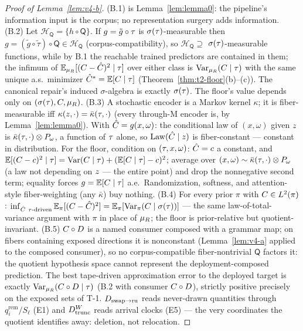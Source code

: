 \begin{proof}[Proof of Lemma~\ref{lem:v4-b}]
(B.1) is Lemma~\ref{lem:lemma0}: the pipeline's information input is the
corpus; no representation surgery adds information. (B.2) Let
$\mathcal{H}_{\mathsf{Q}} = \{h \circ \mathsf{Q}\}$. If
$g = \tilde{g} \circ \tape$ is
$\sigma(\tape)$-measurable then $g = (\tilde{g} \circ \tilde{\tau}) \circ
\mathsf{Q} \in \mathcal{H}_{\mathsf{Q}}$ (corpus-compatibility), so
$\mathcal{H}_{\mathsf{Q}} \supseteq$ $\sigma(\tape)$-measurable functions,
while by
B.1 the reachable trained predictors are contained in them; the infimum of
$\mathbb{E}_{\muR}[(\Ccons - \hat{\Ccons})^2 \mid \tape]$ over either class
is $\mathrm{Var}_{\muR}(\Ccons \mid \tape)$ with the same unique a.s.\
minimizer $\hat{\Ccons}^{*} = \mathbb{E}[\Ccons \mid \tape]$
(Theorem~\ref{thm:t2-floor}(b)--(c)). The canonical repair's induced
$\sigma$-algebra is exactly $\sigma(\tape)$. The floor's value depends only
on $(\sigma(\tape), \Ccons, \muR)$. (B.3) A stochastic encoder is a Markov
kernel $\kappa$; it is fiber-measurable iff
$\kappa(\rawflow, \cdot) = \bar{\kappa}(\tape, \cdot)$ (every through-M
encoder is, by Lemma~\ref{lem:lemma0}). With $\hat{\Ccons} = g(x, \omega)$:
the conditional law of $(x, \omega)$ given $\rawflow$ is
$\bar{\kappa}(\tape, \cdot) \otimes P_\omega$, a function of $\tape$ alone,
so $\mathrm{Law}(\hat{\Ccons} \mid \rawflow)$ is fiber-constant --- constant
in distribution. For the floor, condition on $(\tape, x, \omega)$:
$\hat{\Ccons} = c$ a constant, and
$\mathbb{E}[(\Ccons - c)^2 \mid \tape] = \mathrm{Var}(\Ccons \mid \tape) +
(\mathbb{E}[\Ccons \mid \tape] - c)^2$; average over
$(x,\omega) \sim \bar{\kappa}(\tape,\cdot) \otimes P_\omega$ (a law not
depending on $\rawflow$ --- the entire point) and drop the nonnegative
second term; equality forces $g = \mathbb{E}[\Ccons \mid \tape]$ a.e.\
Randomization, softness, and attention-style fiber-weighting (any
$\bar{\kappa}$) buy nothing. (B.4) For every prior $\pi$ with $\Ccons \in
L^2(\pi)$: $\inf_{\hat{\Ccons}\ \tape\text{-driven}}
\mathbb{E}_\pi[(\Ccons - \hat{\Ccons})^2] =
\mathbb{E}_\pi[\mathrm{Var}_\pi(\Ccons \mid \sigma(\tape))]$ --- the same
law-of-total-variance argument with $\pi$ in place of $\muR$; the floor is
prior-relative but quotient-invariant. (B.5) $\Ccons \circ D$ is a named
consumer composed with a grammar map; on fibers containing exposed
directions it is nonconstant (Lemma~\ref{lem:v4-a} applied to the composed
consumer), so no corpus-compatible fiber-nontrivial $\mathsf{Q}$ factors it: the
quotient hypothesis space cannot represent the deployment-composed
prediction. The best tape-driven approximation error to the deployed target
is exactly $\mathrm{Var}_{\muR}(\Ccons \circ D \mid \tape)$ (B.2 with
consumer $\Ccons \circ D$), strictly positive precisely on the exposed sets
of T-1. $\Dswapru$ reads never-drawn quantities through
$q_i^{\mathrm{rem}}/S_\ell$ (E1) and $\Dtrunc[W]$ reads arrival clocks
(E5) --- the very coordinates the quotient identifies away: deletion, not
relocation.
\end{proof}
